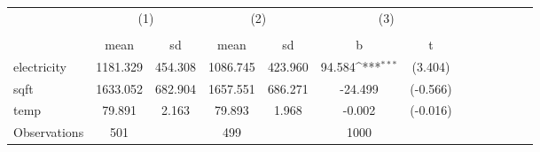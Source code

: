 {
\def\sym#1{\ifmmode^{#1}\else\(^{#1}\)\fi}
\begin{tabular}{l*{3}{cccc}}
\hline\hline
                    &\multicolumn{2}{c}{(1)}  &\multicolumn{2}{c}{(2)}  &\multicolumn{2}{c}{(3)}           \\
                    &\multicolumn{2}{c}{}     &\multicolumn{2}{c}{}     &\multicolumn{2}{c}{}              \\
                    &        mean&          sd&        mean&          sd&           b         &           t\\
\hline
electricity         &    1181.329&     454.308&    1086.745&     423.960&      94.584\sym{***}&     (3.404)\\
sqft                &    1633.052&     682.904&    1657.551&     686.271&     -24.499         &    (-0.566)\\
temp                &      79.891&       2.163&      79.893&       1.968&      -0.002         &    (-0.016)\\
\hline
Observations        &         501&            &         499&            &        1000         &            \\
\hline\hline
\end{tabular}
}
